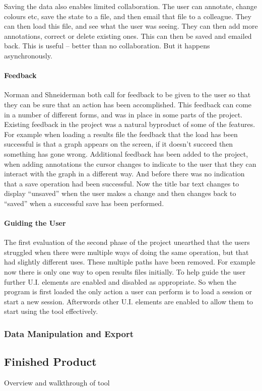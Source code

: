 Saving the data also enables limited collaboration.  The user can annotate, change colours etc, save the state to a file, and then email that file to a colleague.  They can then load this file, and see what the user was seeing.  They can then add more annotations, correct or delete existing ones.  This can then be saved and emailed back.  This is useful -- better than no collaboration.  But it happens asynchronously.

\paragraph{Feedback}
Norman and Shneiderman both call for feedback to be given to the user so that they can be sure that an action has been accomplished.  This feedback can come in a number of different forms, and was in place in some parts of the project.
Existing feedback in the project was a natural byproduct of some of the features.  For example when loading a results file the feedback that the load has been successful is that a graph appears on the screen, if it doesn't succeed then something has gone wrong.  Additional feedback has been added to the project, when adding annotations the cursor changes to indicate to the user that they can interact with the graph in a different way.  And before there was no indication that a save operation had been successful.  Now the title bar text changes to display ``unsaved'' when the user makes a change and then changes back to ``saved'' when a successful save has been performed.

\paragraph{Guiding the User}

The first evaluation of the second phase of the project unearthed that the users struggled when there were multiple ways of doing the same operation, but that had slightly different uses.  These multiple paths have been removed.  For example now there is only one way to open results files initially.  To help guide the user further U.I. elements are enabled and disabled as appropriate.  So when the program is first loaded the only action a user can perform is to load a session or start a new session.  Afterwords other U.I. elements are enabled to allow them to start using the tool effectively.

\subsubsection{Data Manipulation and Export}

\subsection{Finished Product}
Overview and walkthrough of tool
